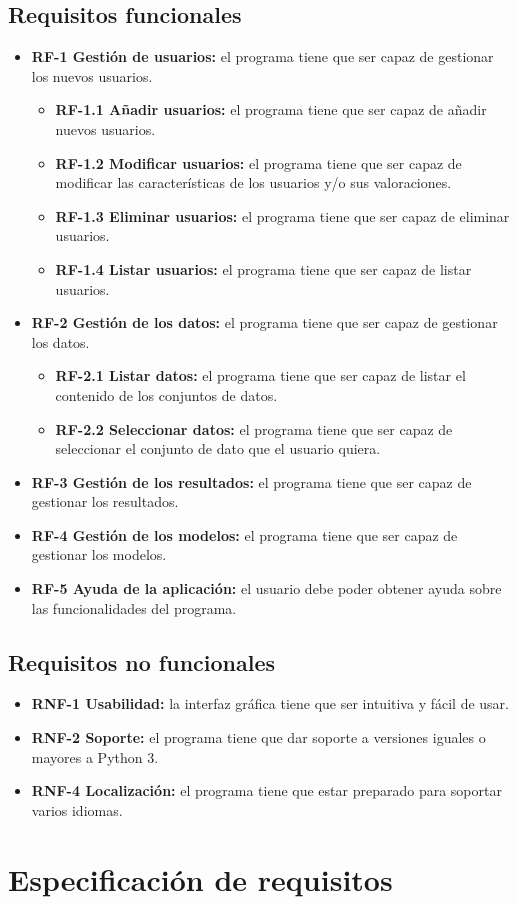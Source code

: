 \subsection{Requisitos funcionales}
\begin{itemize}
\tightlist
\item \textbf{RF-1 Gestión de usuarios:} el programa tiene que ser capaz de gestionar los nuevos usuarios.
\begin{itemize}
\tightlist
\item \textbf{RF-1.1 Añadir usuarios:} el programa tiene que ser capaz de añadir nuevos usuarios.
\item \textbf{RF-1.2 Modificar usuarios:} el programa tiene que ser capaz de modificar las características de los usuarios y/o sus valoraciones.
\item \textbf{RF-1.3 Eliminar usuarios:} el programa tiene que ser capaz de eliminar usuarios.
\item \textbf{RF-1.4 Listar usuarios:} el programa tiene que ser capaz de listar usuarios.
\end{itemize}
\item \textbf{RF-2 Gestión de los datos:} el programa tiene que ser capaz de gestionar los datos.
\begin{itemize}
\tightlist
\item \textbf{RF-2.1 Listar datos:} el programa tiene que ser capaz de listar el contenido de los conjuntos de datos.
\item \textbf{RF-2.2 Seleccionar datos:} el programa tiene que ser capaz de seleccionar el conjunto de dato que el usuario quiera.
\end{itemize}
\item \textbf{RF-3 Gestión de los resultados:} el programa tiene que ser capaz de gestionar los resultados.
\item \textbf{RF-4 Gestión de los modelos:} el programa tiene que ser capaz de gestionar los modelos.
\item \textbf{RF-5 Ayuda de la aplicación:} el usuario debe poder obtener ayuda sobre las funcionalidades del programa.
\end{itemize}

\subsection{Requisitos no funcionales}
\begin{itemize}
\tightlist
\item \textbf{RNF-1 Usabilidad:} la interfaz gráfica tiene que ser intuitiva y fácil de usar.
\item \textbf{RNF-2 Soporte:} el programa tiene que dar soporte a versiones iguales o mayores a Python 3.
\item \textbf{RNF-4 Localización:} el programa tiene que estar preparado para soportar varios idiomas.
\end{itemize}

\section{Especificación de requisitos}



